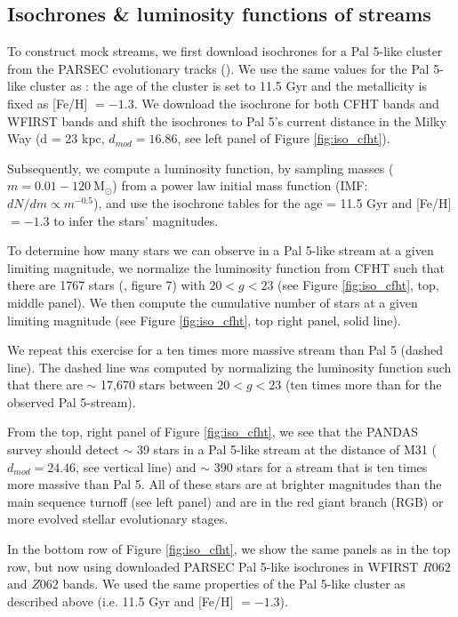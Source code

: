 \documentclass[twocolumn]{aastex62}
\newcommand{\msun}{\textrm{M}_\odot}
\begin{document}
\subsection{Isochrones \& luminosity functions of streams}
\label{sec:lum}
To construct mock streams, we first download isochrones for a Pal 5-like cluster from the PARSEC evolutionary tracks (\citealt{bressan12}). We use the same values for the Pal 5-like cluster as \citet{ibata17}: the age of the cluster is set to 11.5 Gyr and the metallicity is fixed as [Fe/H] $= -1.3$. We download the isochrone for both CFHT bands and WFIRST bands and shift the isochrones to Pal 5's current distance in the Milky Way (d = 23 kpc, $d_{mod} = 16.86$, see left panel of Figure \ref{fig:iso_cfht}). 

Subsequently, we compute a luminosity function, by sampling masses ($m = 0.01 - 120 ~\msun$) from a power law initial mass function (IMF: $dN/dm \propto m^{-0.5}$), and use the isochrone tables for the age = 11.5 Gyr and [Fe/H] $= -1.3$ to infer the stars' magnitudes. 

To determine how many stars we can observe in a Pal 5-like stream at a given limiting magnitude, we normalize the luminosity function from CFHT such that there are 1767 stars (\citealt{ibata16}, figure 7) with $20 < g < 23$ (see Figure \ref{fig:iso_cfht}, top, middle panel). We then compute the cumulative number of stars at a given limiting magnitude (see Figure \ref{fig:iso_cfht}, top right panel, solid line).

We repeat this exercise for a ten times more massive stream than Pal 5 (dashed line). The dashed line was computed by normalizing the luminosity function such that there are $\sim$ 17,670 stars between $20 < g < 23$ (ten times more than for the observed Pal 5-stream). 

From the top, right panel of Figure \ref{fig:iso_cfht}, we see that the PANDAS survey should detect $\sim$ 39 stars in a Pal 5-like stream at the distance of M31 ($d_{mod} = 24.46$, see vertical line) and $\sim$ 390 stars for a stream that is ten times more massive than Pal 5. All of these stars are at brighter magnitudes than the main sequence turnoff (see left panel) and are in the red giant branch (RGB) or more evolved stellar evolutionary stages. 

In the bottom row of Figure \ref{fig:iso_cfht}, we show the same panels as in the top row, but now using downloaded PARSEC Pal 5-like isochrones in WFIRST $R062$ and $Z062$ bands. We used the same properties of the Pal 5-like cluster as described above (i.e. 11.5 Gyr and [Fe/H] $= -1.3$). 
\end{document}
